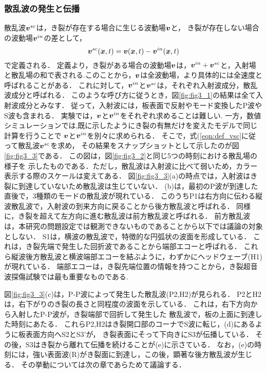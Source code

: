 \subsubsection{散乱波の発生と伝播}
散乱波$\mbox{\boldmath $v$}^{sc}$は，き裂が存在する場合に生じる波動場$\mbox{\boldmath $v$}$と，
き裂が存在しない場合の波動場$\mbox{\boldmath $v$}^{in}$の差として，
\begin{equation}
	\fat{v}^{sc}(\fat{x},t)=\fat{v}(\fat{x},t)-\fat{v}^{in}(\fat{x},t)
	\label{eqn:def_vsc}
\end{equation}
で定義される\cite{JDA}．
定義より，き裂がある場合の波動場$\mbox{\boldmath $v$}$は，$\mbox{\boldmath $v$}^{in}+\mbox{\boldmath $v$}^{sc}$と，入射場と散乱場の和で表される.このことから，$\mbox{\boldmath $v$}$は全波動場，より具体的には全速度と呼ばれることがある．
これに対して，$\mbox{\boldmath $v$}^{in}$と$\mbox{\boldmath $v$}^{sc}$は，それぞれ入射波成分，散乱波成分と呼ばれる．
このような呼び方に従うとき，図\ref{fig:fig3_1}の結果は全て入射波成分とみなす．
従って，入射波には，板表面で反射やモード変換したP波やS波も含まれる．
実験では，$\mbox{\boldmath $v$}$と$\mbox{\boldmath $v$}^{in}$をそれぞれ求めることは難しい.
一方，数値シミュレーションでは,既に示したようにき裂の有無だけを変えたモデルで同じ計算を行うことで
$\mbox{\boldmath $v$}$と$\mbox{\boldmath $v$}^{in}$を別々に求められる．
そこで，式(\ref{eqn:def_vsc}に従って散乱波$\mbox{\boldmath $v$}^{sc}$を求め，
その結果をスナップショットとして示したのが図\ref{fig:fig3_3}である．
この図は，図\ref{fig:fig3_2}と同じ5つの時刻における散乱場の様子を
示したものである．ただし，散乱波は入射波に比べて弱いため，カラー表示する際のスケールは変えてある．
図\ref{fig:fig3_3}(a)の時点では，入射波はき裂に到達していないため散乱波は生じていない．
(b)は，最初のP波が到達した直後で，3種類のモードの散乱波が現れている．
このうちP1は右方向に伝わる縦波散乱波で，入射波の到来方向に戻ることから後方散乱波と呼ばれる．
同様に，き裂を超えて左方向に進む散乱波は前方散乱波と呼ばれる．
前方散乱波は，本研究の問題設定では観測できないものであることから以下では議論の対象としない．
S1は，横波の散乱波で，特徴的な円弧状の波面を形成している．
これは，き裂先端で発生した回折波であることから端部エコーと呼ばれる．
これら縦波後方散乱波と横波端部エコーを結ぶように，わずかにヘッドウェーブ(H1)が現れている．
端部エコーは，き裂先端位置の情報を持つことから，き裂超音波探傷試験では最も重要なものである.

図\ref{fig:fig3_3}(c)は，P-P波によって発生した散乱波(P2,H2)が見られる．
P2とH2は，右下がりのき裂の長さと同程度の波面を示している．
これは，右下方向から入射したP-P波が，き裂端部で回折して発生した
散乱波で，板の上面に到達した時刻にあたる．
これらP2,H2はき裂開口部のコーナでS波に転じ，(d)にあるように板表面方向へS2とS3'が，
き裂表面にそって下向きにS3が伝播している．
その後，S3はき裂から離れて伝播を続けることが(e)に示さている．
なお，(e)の時刻には，強い表面波(R)がき裂面に到達し，この後，顕著な後方散乱波が生じる．
その挙動については次の章であらためて議論する．
%
